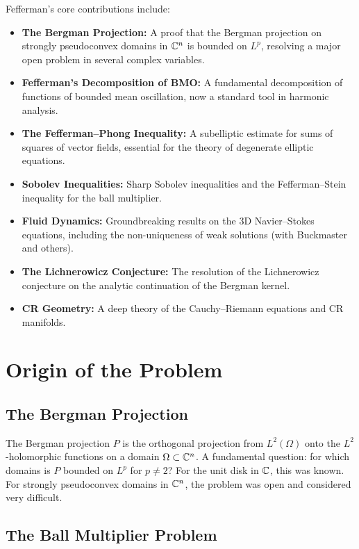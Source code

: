 Fefferman's core contributions include:
\begin{itemize}
    \item \textbf{The Bergman Projection:} A proof that the Bergman projection on strongly pseudoconvex domains in $\mathbb{C}^n$ is bounded on $L^p$, resolving a major open problem in several complex variables.
    \item \textbf{Fefferman's Decomposition of BMO:} A fundamental decomposition of functions of bounded mean oscillation, now a standard tool in harmonic analysis.
    \item \textbf{The Fefferman--Phong Inequality:} A subelliptic estimate for sums of squares of vector fields, essential for the theory of degenerate elliptic equations.
    \item \textbf{Sobolev Inequalities:} Sharp Sobolev inequalities and the Fefferman--Stein inequality for the ball multiplier.
    \item \textbf{Fluid Dynamics:} Groundbreaking results on the 3D Navier--Stokes equations, including the non-uniqueness of weak solutions (with Buckmaster and others).
    \item \textbf{The Lichnerowicz Conjecture:} The resolution of the Lichnerowicz conjecture on the analytic continuation of the Bergman kernel.
    \item \textbf{CR Geometry:} A deep theory of the Cauchy--Riemann equations and CR manifolds.
\end{itemize}

\section{Origin of the Problem}

\subsection{The Bergman Projection}

The Bergman projection $P$ is the orthogonal projection from $L^2(\Omega)$ onto the $L^2$-holomorphic functions on a domain $\Omega \subset \mathbb{C}^n$. A fundamental question: for which domains is $P$ bounded on $L^p$ for $p \neq 2$? For the unit disk in $\mathbb{C}$, this was known. For strongly pseudoconvex domains in $\mathbb{C}^n$, the problem was open and considered very difficult.

\subsection{The Ball Multiplier Problem}

